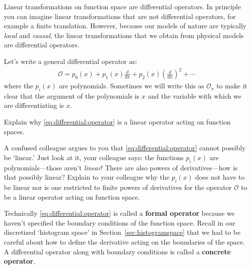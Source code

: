 \documentclass[12pt, oneside]{report}    %
\begin{document}
Linear transformations on function space are differential operators. In principle you can imagine linear transformations that are not differential operators, for example a finite translation. However, because our models of nature are typically \emph{local} and \emph{causal}, the linear transformations that we obtain from physical models are differential operators. 

Let's write a general differential operator as:
\begin{align}
  \mathcal O = 
  p_0(x) 
  + p_1(x) \frac{d}{dx}
  + p_2(x) \left(\frac{d}{dx}\right)^2
  + \cdots
  \label{eq:differential:operator}
\end{align}
where the $p_i(x)$ are polynomials. Sometimes we will write this as $\mathcal O_x$ to make it clear that the argument of the polynomials is $x$ and the variable with which we are differentiating is $x$.  
\begin{exercise}
Explain why \eqref{eq:differential:operator} is a linear operator acting on function spaces.
\end{exercise}
\begin{exercise}
A confused colleague argues to you that \eqref{eq:differential:operator} cannot possibly be `linear.' Just look at it, your colleague says: the functions $p_i(x)$ are polynomials---those aren't \emph{linear}! There are also powers of derivatives---how is that possibly linear? Explain to your colleague why the $p_i(x)$ does not have to be linear nor is one restricted to finite powers of derivatives for the operator $\mathcal O$ to be a linear operator acting on function space.
\end{exercise}
Technically \eqref{eq:differential:operator} is called a \textbf{formal operator} because we haven't specified the boundary conditions of the function space. Recall in our discretized `histogram space' in Section~\ref{sec:histogramspace} that we had to be careful about how to define the derivative acting on the boundaries of the space. A differential operator along with boundary conditions is called a \textbf{concrete operator}.
\end{document}
